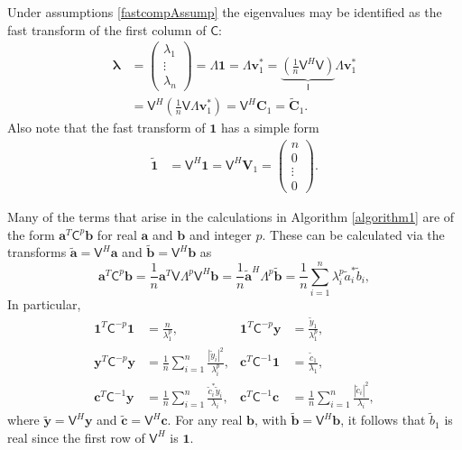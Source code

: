 \documentclass[twocolumn]{svjour3}          %
\newcommand{\bm}[1]{\boldsymbol{#1}}
\newcommand{\vlambda}{{\bm{\lambda}}}
\newcommand{\va}{\bm{a}}
\newcommand{\vb}{\bm{b}}
\newcommand{\vc}{\bm{c}}
\newcommand{\vC}{\bm{C}}
\newcommand{\vv}{\bm{v}}
\newcommand{\vV}{\bm{V}}
\newcommand{\vy}{\bm{y}}
\newcommand{\vone}{\bm{1}}
\newcommand{\mC}{\mathsf{C}}
\newcommand{\mCInv}{{\mathsf{C}^{-1}}}
\newcommand{\mLambda}{\mathsf{\Lambda}}
\newcommand{\mV}{\mathsf{V}}
\def\abs#1{\ensuremath{\left \lvert #1 \right \rvert}}
\begin{document}
Under assumptions \eqref{fastcompAssump} the eigenvalues may be identified as the fast transform of the first column of $\mC$:
\begin{align}
\nonumber
\vlambda 
& = \begin{pmatrix}
\lambda_1 \\ \vdots \\ \lambda_n
\end{pmatrix} = \mLambda \vone = \mLambda \vv_1^* 
= \underbrace{\left( \frac 1n \mV^H  \mV \right) }_{\mathsf{I}} \mLambda \vv_1^* \\
&= \mV^H \left( \frac 1n \mV \mLambda \vv_1^* \right)
= \mV^H \vC_1 =  \widetilde{\vC}_1.
\label{eqn:fast_transform_to_eigvalues}
\end{align}
Also note that the fast transform of $\vone$ has a simple form
\begin{align}
\widetilde{\vone}
& = \mV^H \vone = \mV^H \vV_1 = \begin{pmatrix}n  \\ 0 \\ \vdots \\ 0 \end{pmatrix}.
\label{eqn:fast_transform_one}
\end{align}

Many of the terms that arise in the calculations in  Algorithm \ref{algorithm1} are of the form $\va^T\mC^{p}\vb$ for real $\va$ and $\vb$ and integer $p$.  These can be calculated via the transforms $\widetilde{\va} = \mV^H \va$ and $\widetilde{\vb} = \mV^H \vb$ as 
\begin{equation*}
\va^T\mC^p\vb = \frac 1n \va^T \mV \mLambda^p \mV^H \vb
= \frac 1n \widetilde{\va}^H\mLambda^p \widetilde{\vb}
= \frac 1n \sum_{i=1}^n \lambda_i^p \widetilde{a}_i^* \widetilde{b}_i, 
\end{equation*}
In particular,
\begin{align*}
\vone^T\mC^{-p}\vone & = \frac{n}{\lambda_1^p},
&
\vone^T\mC^{-p}\vy &= \frac{\widetilde{y}_1}{\lambda_1^p},
\\
\vy^T\mC^{-p} \vy &= \frac 1n \sum_{i=1}^n \frac{\abs{\widetilde{y}_i}^2}{\lambda_i^p},
&
\vc^T\mCInv \vone &= \frac{\widetilde{c}_1}{\lambda_1},\\
\vc^T\mCInv \vy &= \frac 1n \sum_{i=1}^n \frac{\widetilde{c}_i^* \widetilde{y}_i}{\lambda_i}, & 
\vc^T\mCInv \vc &= \frac 1n \sum_{i=1}^n \frac{\abs{\widetilde{c}_i}^2}{\lambda_i},
\end{align*}
where $\widetilde{\vy} = \mV^H \vy$ and 
$\widetilde{\vc} = \mV^H \vc$.  For any real $\vb$, with $\widetilde{\vb} = \mV^H\vb$, it follows that $\widetilde{b}_1$ is real since the first row of $\mV^H$ is $\vone$.
\end{document}
